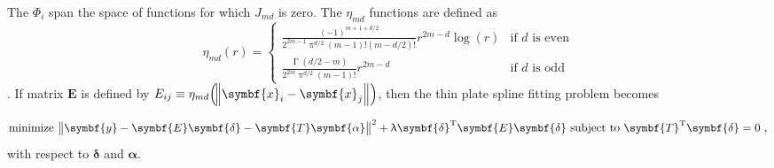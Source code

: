 The \(\Phi_i\) span the space of functions for which \(J_{md}\) is zero.  The \(\eta_{md}\) functions are defined as
\begin{equation}
  \label{eq:ThinPlateSplinesEtaFunctionDefinition}
  \eta_{md}(r) =
  \begin{cases}
    \frac{(-1)^{m + 1 + d / 2}}{2^{2m - 1}\uppi^{d / 2}(m - 1)!(m - d / 2)!}r^{2m - d}\log(r) & \text{if \(d\) is even} \\
    \frac{\upGamma (d / 2 - m)}{2^{2m}\uppi^{d / 2}(m - 1)!}r^{2m - d} & \text{if \(d\) is odd}
  \end{cases}
\end{equation}
\parencite{Wood2006}.  If matrix \(\symbf{E}\) is defined by \(E_{ij} \equiv \eta_{md}\Bigl(\norm{\symbf{x}_i - \symbf{x}_j}\Bigr)\), then the thin plate spline fitting problem becomes

\begin{equation}
  \label{eq:ThinPlateSplineSimplifiedFittingProblem}
  \text{minimize } \norm{\symbf{y} - \symbf{E}\symbf{\delta} - \symbf{T}\symbf{\alpha}}^2 + \uplambda \symbf{\delta}^{\text{T}}\symbf{E}\symbf{\delta} \text{ subject to } \symbf{T}^{\text{T}}\symbf{\delta} = 0~,
\end{equation}
with respect to \(\symbf{\delta}\) and \(\symbf{\alpha}\).

